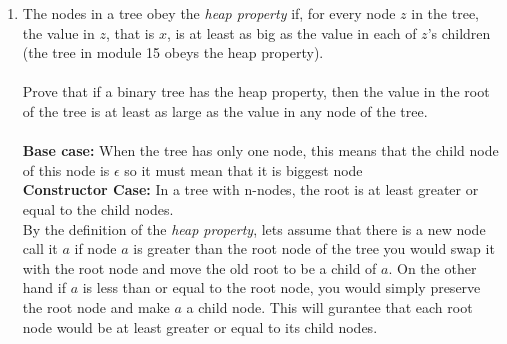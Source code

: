 \documentclass[12pt]{article}
\begin{document}
\begin{enumerate}
\item The nodes in a tree obey the \textit{heap property} if, for every node $z$ in the tree, the value in $z$, that is $x$, is at least as big as the value in each of $z$'s children (the tree in module 15 obeys the heap property).\\\\
Prove that if a binary tree has the heap property, then the value in the root of the tree is at least as large as the value in any node of the tree. \\\\
\textbf{Base case: } When the tree has only one node, this means that the child node of this node is $\epsilon$ so it must mean that it is biggest node \\
\textbf{Constructor Case: } In a tree with n-nodes, the root is at least greater or equal to the child nodes.\\
By the definition of the \textit{heap property}, lets assume that there is a new node call it $a$ if node $a$ is greater than the root node of the tree you would swap it with the root node and move the old root to be a child of $a$. On the other hand if $a$ is less than or equal to the root node, you would simply preserve the root node and make $a$ a child node. This will gurantee that each root node would be at least greater or equal to its child nodes.


\end{enumerate}
\end{document}
